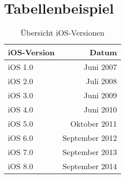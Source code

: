 \chapter{Tabellenbeispiel}
\begin{table}[htbp]
	\caption{Übersicht iOS-Versionen}
	\begin{center}
		\begin{tabular}{l  r}
			\textbf{iOS-Version} & \textbf{Datum} \\ 
			\hline
			iOS 1.0 & Juni 2007 \\
			iOS 2.0 & Juli 2008 \\
			iOS 3.0 & Juni 2009 \\
			iOS 4.0 & Juni 2010 \\
			iOS 5.0 & Oktober 2011 \\
			iOS 6.0 & September 2012 \\
			iOS 7.0 & September 2013 \\
			iOS 8.0 & September 2014 \\
		\end{tabular}
		
	\end{center}
\end{table}

\cleardoubleemptypage %